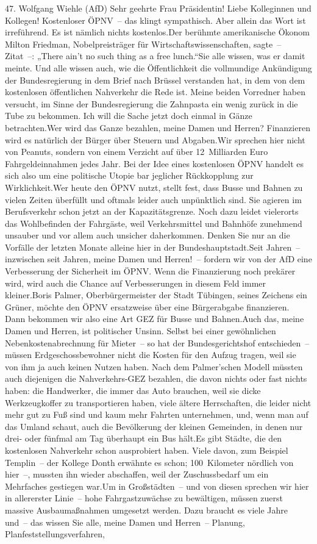 \documentclass{article}
\begin{document}
	47. Wolfgang Wiehle (AfD) Sehr geehrte Frau Präsidentin! Liebe Kolleginnen und Kollegen! Kostenloser ÖPNV – das klingt sympathisch. Aber allein das Wort ist irreführend. Es ist nämlich nichts kostenlos.Der berühmte amerikanische Ökonom Milton Friedman, Nobelpreisträger für Wirtschaftswissenschaften, sagte – Zitat –: „There ain’t no such thing as a free lunch.“Sie alle wissen, was er damit meinte. Und alle wissen auch, wie die Öffentlichkeit die vollmundige Ankündigung der Bundesregierung in dem Brief nach Brüssel verstanden hat, in dem von dem kostenlosen öffentlichen Nahverkehr die Rede ist. Meine beiden Vorredner haben versucht, im Sinne der Bundesregierung die Zahnpasta ein wenig zurück in die Tube zu bekommen. Ich will die Sache jetzt doch einmal in Gänze betrachten.Wer wird das Ganze bezahlen, meine Damen und Herren? Finanzieren wird es natürlich der Bürger über Steuern und Abgaben.Wir sprechen hier nicht von Peanuts, sondern von einem Verzicht auf über 12 Milliarden Euro Fahrgeldeinnahmen jedes Jahr. Bei der Idee eines kostenlosen ÖPNV handelt es sich also um eine politische Utopie bar jeglicher Rückkopplung zur Wirklichkeit.Wer heute den ÖPNV nutzt, stellt fest, dass Busse und Bahnen zu vielen Zeiten überfüllt und oftmals leider auch unpünktlich sind. Sie agieren im Berufsverkehr schon jetzt an der Kapazitätsgrenze. Noch dazu leidet vielerorts das Wohlbefinden der Fahrgäste, weil Verkehrsmittel und Bahnhöfe zunehmend unsauber und vor allem auch unsicher daherkommen. Denken Sie nur an die Vorfälle der letzten Monate alleine hier in der Bundeshauptstadt.Seit Jahren – inzwischen seit Jahren, meine Damen und Herren! – fordern wir von der AfD eine Verbesserung der Sicherheit im ÖPNV. Wenn die Finanzierung noch prekärer wird, wird auch die Chance auf Verbesserungen in diesem Feld immer kleiner.Boris Palmer, Oberbürgermeister der Stadt Tübingen, seines Zeichens ein Grüner, möchte den ÖPNV ersatzweise über eine Bürgerabgabe finanzieren. Dann bekommen wir also eine Art GEZ für Busse und Bahnen.Auch das, meine Damen und Herren, ist politischer Unsinn. Selbst bei einer gewöhnlichen Nebenkostenabrechnung für Mieter – so hat der Bundesgerichtshof entschieden – müssen Erdgeschossbewohner nicht die Kosten für den Aufzug tragen, weil sie von ihm ja auch keinen Nutzen haben. Nach dem Palmer’schen Modell müssten auch diejenigen die Nahverkehrs-GEZ bezahlen, die davon nichts oder fast nichts haben: die Handwerker, die immer das Auto brauchen, weil sie dicke Werkzeugkoffer zu transportieren haben, viele ältere Herrschaften, die leider nicht mehr gut zu Fuß sind und kaum mehr Fahrten unternehmen, und, wenn man auf das Umland schaut, auch die Bevölkerung der kleinen Gemeinden, in denen nur drei- oder fünfmal am Tag überhaupt ein Bus hält.Es gibt Städte, die den kostenlosen Nahverkehr schon ausprobiert haben. Viele davon, zum Beispiel Templin – der Kollege Donth erwähnte es schon; 100 Kilometer nördlich von hier –, mussten ihn wieder abschaffen, weil der Zuschussbedarf um ein Mehrfaches gestiegen war.Um in Großstädten – und von diesen sprechen wir hier in allererster Linie – hohe Fahrgastzuwächse zu bewältigen, müssen zuerst massive Ausbaumaßnahmen umgesetzt werden. Dazu braucht es viele Jahre und – das wissen Sie alle, meine Damen und Herren – Planung, Planfeststellungsverfahren, 
\end{document}
